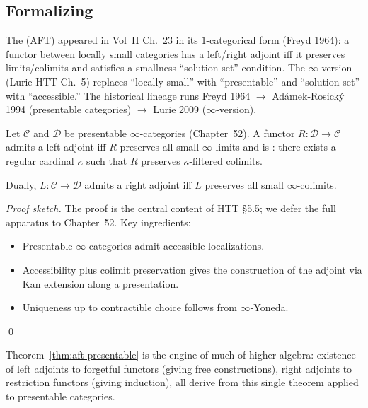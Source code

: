 \subsection{Formalizing}

\begin{nameorigin}
The  (AFT) appeared in Vol~II Ch.~23 in
its $1$-categorical form (Freyd 1964): a functor between locally
small categories has a left/right adjoint iff it preserves limits/colimits
and satisfies a smallness ``solution-set'' condition. The
$\infty$-version (Lurie HTT Ch.~5) replaces ``locally small'' with
``presentable'' and ``solution-set'' with ``accessible.'' The historical
lineage runs Freyd 1964 $\to$ Adámek-Rosický 1994 (presentable
categories) $\to$ Lurie 2009 ($\infty$-version).
\end{nameorigin}

\begin{theorem}
\label{thm:aft-presentable}
Let $\mathcal{C}$ and $\mathcal{D}$ be presentable $\infty$-categories
(Chapter~52). A functor $R : \mathcal{D} \to \mathcal{C}$ admits a left
adjoint iff $R$ preserves all small $\infty$-limits and is
: there exists a regular cardinal $\kappa$ such that
$R$ preserves $\kappa$-filtered colimits.

Dually, $L : \mathcal{C} \to \mathcal{D}$ admits a right adjoint iff $L$
preserves all small $\infty$-colimits.
\end{theorem}

\begin{proof}[Proof sketch]
The proof is the central content of HTT §5.5; we defer the full apparatus
to Chapter~52. Key ingredients:
\begin{itemize}
  \item Presentable $\infty$-categories admit accessible localizations.
  \item Accessibility plus colimit preservation gives the construction
        of the adjoint via Kan extension along a presentation.
  \item Uniqueness up to contractible choice follows from $\infty$-Yoneda.
\end{itemize}
\qed
\end{proof}

\begin{remark}
Theorem~\ref{thm:aft-presentable} is the engine of much of higher
algebra: existence of left adjoints to forgetful functors (giving free
constructions), right adjoints to restriction functors (giving induction),
all derive from this single theorem applied to presentable categories.
\end{remark}


